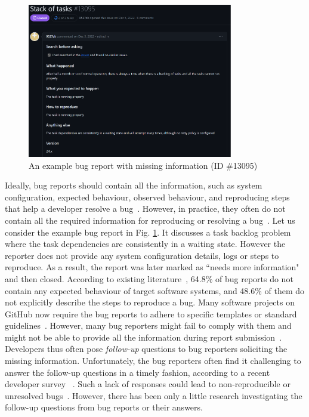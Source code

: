 \begin{figure} [!htbp]
    \centering \includegraphics[width=0.8\textwidth]{images/intro_missing_info_eg.png} 
    \caption{An example bug report with missing information (ID \#13095)}
    \label{fig:missinginfo}
\end{figure}

Ideally, bug reports should contain all the information, such as system configuration, expected behaviour, observed behaviour, and reproducing steps that help a developer resolve a bug~\cite{chaparro2017detecting}. However, in practice, they often do not contain all the required information for reproducing or resolving a bug~\cite{chaparro2017detecting}. Let us consider the example bug report in Fig. \ref{fig:missinginfo}. It discusses a task backlog problem where the task dependencies are consistently in a waiting state. However the reporter does not provide any system configuration details, logs or steps to reproduce. As a result, the report was later marked as ``needs more information" and then closed. According to existing literature~\cite{chaparro2017detecting},  64.8\% of bug reports do not contain any expected behaviour of target software systems, and 48.6\% of them do not explicitly describe the steps to reproduce a bug. Many software projects on GitHub now require the bug reports to adhere to specific templates or standard guidelines~\cite{githubguidelines}. However, many bug reporters might fail to comply with them and might not be able to provide all the information during report submission~\cite {imran2021automatically}. Developers thus often pose \textit{follow-up} questions to bug reporters soliciting the missing information. Unfortunately, the bug reporters often find it challenging to answer the follow-up questions in a timely fashion, according to a recent developer survey ~\cite{rahman2020some}. Such a lack of responses could lead to non-reproducible or unresolved bugs~\cite{breu2010information}. However, there has been only a little research investigating the follow-up questions from bug reports or their answers.

